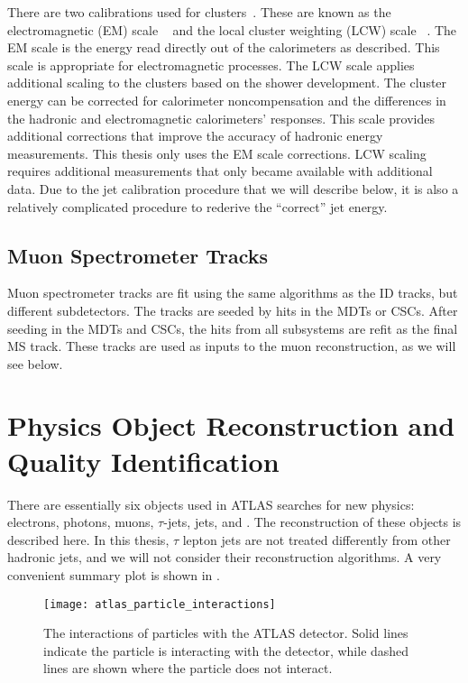 There are two calibrations used for clusters~\cite{PERF-2011-04}.
These are known as the electromagnetic (EM) scale ~\cite{PERF-2010-04} and the local cluster weighting (LCW) scale ~\cite{PERF-2014-07}.
The EM scale is the energy read directly out of the calorimeters as described.
This scale is appropriate for electromagnetic processes.
The LCW scale applies additional scaling to the clusters based on the shower development.
The cluster energy can be corrected for calorimeter noncompensation and the differences in the hadronic and electromagnetic calorimeters' responses.
This scale provides additional corrections that improve the accuracy of hadronic energy measurements.
This thesis only uses the EM scale corrections.
LCW scaling requires additional measurements that only became available with additional data.
Due to the jet calibration procedure that we will describe below, it is also a relatively complicated procedure to rederive the ``correct'' jet energy.

\subsection{Muon Spectrometer Tracks}\label{sec:ms_tracks}

Muon spectrometer tracks are fit using the same algorithms as the ID tracks, but different subdetectors.
The tracks are seeded by hits in the MDTs or CSCs.
After seeding in the MDTs and CSCs, the hits from all subsystems are refit as the final MS track.
These tracks are used as inputs to the muon reconstruction, as we will see below.

\section{Physics Object Reconstruction and Quality Identification}

There are essentially six objects used in ATLAS searches for new physics: electrons, photons, muons, $\tau$-jets, jets, and \met.
The reconstruction of these objects is described here.
In this thesis, $\tau$ lepton jets are not treated differently from other hadronic jets, and we will not consider their reconstruction algorithms.
A very convenient summary plot is shown in .
\begin{figure}
\caption{The interactions of particles with the ATLAS detector.
Solid lines indicate the particle is interacting with the detector, while dashed lines are shown where the particle does not interact.} \label{fig:atlas_interactions}
\texttt{[image: atlas\_particle\_interactions]}
\end{figure}

